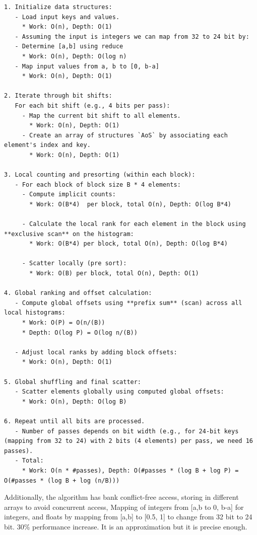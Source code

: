 \documentclass{article}
\begin{document}
\begin{lstlisting}
1. Initialize data structures:
   - Load input keys and values.
     * Work: O(n), Depth: O(1)
   - Assuming the input is integers we can map from 32 to 24 bit by:
   - Determine [a,b] using reduce
     * Work: O(n), Depth: O(log n)
   - Map input values from a, b to [0, b-a]
     * Work: O(n), Depth: O(1)
     
2. Iterate through bit shifts:
   For each bit shift (e.g., 4 bits per pass):
     - Map the current bit shift to all elements.
       * Work: O(n), Depth: O(1)
     - Create an array of structures `AoS` by associating each element's index and key.
       * Work: O(n), Depth: O(1)

3. Local counting and presorting (within each block):
   - For each block of block size B * 4 elements:
     - Compute implicit counts:
       * Work: O(B*4)  per block, total O(n), Depth: O(log B*4)

     - Calculate the local rank for each element in the block using **exclusive scan** on the histogram:
       * Work: O(B*4) per block, total O(n), Depth: O(log B*4)

     - Scatter locally (pre sort):
       * Work: O(B) per block, total O(n), Depth: O(1)

4. Global ranking and offset calculation:
   - Compute global offsets using **prefix sum** (scan) across all local histograms:
     * Work: O(P) = O(n/(B))
     * Depth: O(log P) = O(log n/(B))

   - Adjust local ranks by adding block offsets:
     * Work: O(n), Depth: O(1)

5. Global shuffling and final scatter:
   - Scatter elements globally using computed global offsets:
     * Work: O(n), Depth: O(log B)

6. Repeat until all bits are processed.
   - Number of passes depends on bit width (e.g., for 24-bit keys (mapping from 32 to 24) with 2 bits (4 elements) per pass, we need 16 passes).
   - Total:
     * Work: O(n * #passes), Depth: O(#passes * (log B + log P) = O(#passes * (log B + log (n/B)))
\end{lstlisting}

Additionally, the algorithm has bank conflict-free access, storing in different arrays to avoid concurrent access, 
Mapping of integers from [a,b to 0, b-a] for integers, and floats by mapping from [a,b] to [0.5, 1] to change from 32 bit to 24 bit. 30\% performance increase. It is an approximation but it is precise enough.
\end{document}
